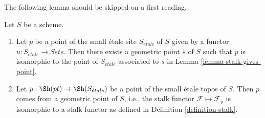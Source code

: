 \noindent
The following lemma should be skipped on a first reading.

\begin{lemma}
\label{lemma-points-small-etale-site}
Let $S$ be a scheme.
\begin{enumerate}
\item Let $p$ be a point of the small \'etale site
$S_{\acute{e}tale}$ of $S$ given by a functor
$u : S_{\acute{e}tale} \to \textit{Sets}$.
Then there exists a geometric point $\overline{s}$ of $S$ such that
$p$ is isomorphic to the point of $S_{\acute{e}tale}$ associated to
$\overline{s}$ in
Lemma \ref{lemma-stalk-gives-point}.
\item Let $p : \Sh(pt) \to \Sh(S_{\acute{e}tale})$ be a point
of the small \'etale topos of $S$. Then $p$ comes from a geometric point
of $S$, i.e., the stalk functor $\mathcal{F} \mapsto \mathcal{F}_p$
is isomorphic to a stalk functor as defined in
Definition \ref{definition-stalk}.
\end{enumerate}
\end{lemma}

